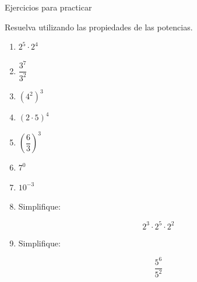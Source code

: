 \documentclass[aspectratio=169,10pt,handout]{beamer}
\begin{document}
	\begin{frame}{Ejercicios para practicar}
		
		Resuelva utilizando las propiedades de las potencias.
		
		\begin{enumerate}
			
			\item \(2^5 \cdot 2^4\)
			
			\item \(\dfrac{3^7}{3^2}\)
			
			\item \((4^2)^3\)
			
			\item \((2\cdot5)^4\)
			
			\item \(\left(\dfrac{6}{3}\right)^3\)
			
			\item \(7^0\)
			
			\item \(10^{-3}\)
			
			\item Simplifique:
			
			\[
			2^3 \cdot 2^5 \cdot 2^2
			\]
			
			\item Simplifique:
			
			\[
			\dfrac{5^6}{5^2}
			\]
			
		\end{enumerate}
		
	\end{frame}
	
\end{document}
